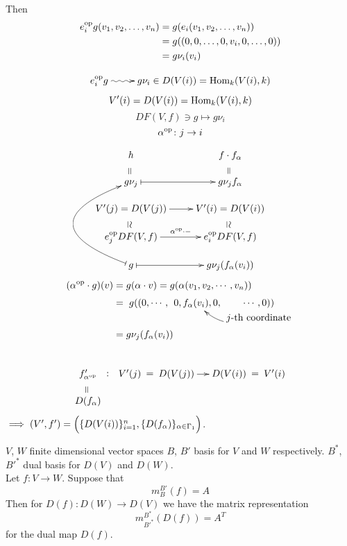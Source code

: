 
Then 
\begin{equation*}
\begin{split}
e_i^{{\operatorname{op}\nolimits}}g(v_1, v_2, \ldots, v_n) &= g(e_i(v_1, v_2, \ldots, v_n))\\
&= g((0,0, \ldots,0, v_i,0, \ldots, 0 ))\\
&= g\nu_i(v_i)
\end{split}
\end{equation*}

\[\xymatrix{
e_i^{\op}g \ar@{~>}[r]& g\nu_i \in D(V(i)) = \Hom_k(V(i), k)
}\]
\[ V'(i) = D(V(i)) = \operatorname{Hom}_k(V(i), k) \]
\[ DF(V, f) \ni g \mapsto g\nu_i \]
\[ \alpha^{{\operatorname{op}\nolimits}}\colon j \to i \]

\[\xymatrix@R-1pc{
h \ar@{}[d]|-*[@]{=}  & f\cdot f_\alpha \ar@{}[d]|-*[@]{=}\\
g\nu_j \ar@{|->}[r] & g \nu_j f_\alpha\\
V'(j) = D(V(j)) \ar@{}[d]|-*[@]{\simeq} \ar[r] & V'(i) = D(V(i)) \ar@{}[d]|-*[@]{\simeq}\\
e_j^{\op}DF(V, f) \ar[r]^{\alpha^{\op} \cdot -} & e_i^{\op}DF(V,f)\\
\ar@{|->}@/^5pc/[uuu] g \ar@{|->}[r] & g\nu_j(f_\alpha(v_i))
}\]
\begin{equation*}
\begin{split}
(\alpha^{\op}\cdot g)(v) &= g(\alpha \cdot v) = g(\alpha(v_1, v_2, \cdots, v_n))\\
&= \xymatrix@C-2pc@R-2pc{g((0, \cdots, & 0, f_\alpha(v_i), 0, & \cdots , 0))\\
&& \ar@/^1pc/[ul] j\text{-th coordinate} }\\
&= g\nu_j(f_\alpha(v_i))
\end{split}
\end{equation*}
\\
\[\xymatrix@C-1pc@R-1pc{
f'_{\alpha^{\op}} \ar@{}[d]|-*[@]{=} \ar@{}[r]|-*[@]{:} & V'(j) \ar@{}[r]|-*[@]{=} & D(V(j)) \ar[r] & D(V(i)) \ar@{}[r]|-*[@]{=} & V'(i)\\
D(f_\alpha) 
}\]
$\implies (V', f') = \Big( \{ D(V(i)) \}_{i=1}^n, \{ D(f_\alpha) \}_{\alpha \in \Gamma_1} \Big)$.

\begin{exer}
$V$, $W$ finite dimensional vector spaces $B$, $B'$ basis for $V$ and $W$ respectively. $B^*$, $B'^*$ dual basis for $D(V)$ and $D(W)$.\\
Let $f\colon V \to W$. Suppose that \[m_B^{B'}(f) = A\]
Then for $D(f)\colon D(W) \to D(V)$ we have the matrix representation \[ m_{B'^*}^{B^*}(D(f)) = A^T \] for the dual map $D(f)$.
\end{exer}

